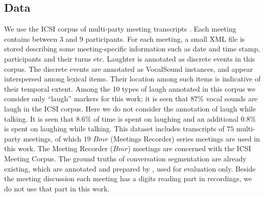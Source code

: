 \documentclass{article}
\begin{document}
\subsection{Data}\label{sec:data}
We use the ICSI corpus of multi-party meeting transcripts \cite{janin-03}. %
Each meeting contains between 3 and 9 participants. For each meeting, a small XML file is stored describing some meeting-specific information such as date and time stamp, participants and their turns etc. %
Laughter is annotated as discrete events in this corpus. The discrete events are annotated as VocalSound instances, and appear interspersed among lexical items. Their location among such items is indicative of their temporal extent. Among the 10 types of laugh annotated in this corpus we consider only ``laugh'' markers for this work; it is seen that $87\%$ vocal sounds are laugh in the ICSI corpus. Here we do not consider the annotation of laugh while talking. It is seen that $8.6\%$ of time is spent on laughing and an additional $0.8\%$ is spent on laughing while talking.
%
This dataset includes transcripts of $75$ multi-party meetings, of which $19$ $Bmr$ (Meetings Recorder) series meetings are used in this work. The Meeting Recorder ($Bmr$) meetings are concerned with the ICSI Meeting Corpus. The ground truths of conversation segmentation are already existing, which are annotated and prepared by \cite{galley-03}, used for evaluation only. Beside the meeting discussion each meeting has a digits reading part in recordings, we do not use that part in this work. %
\end{document}
